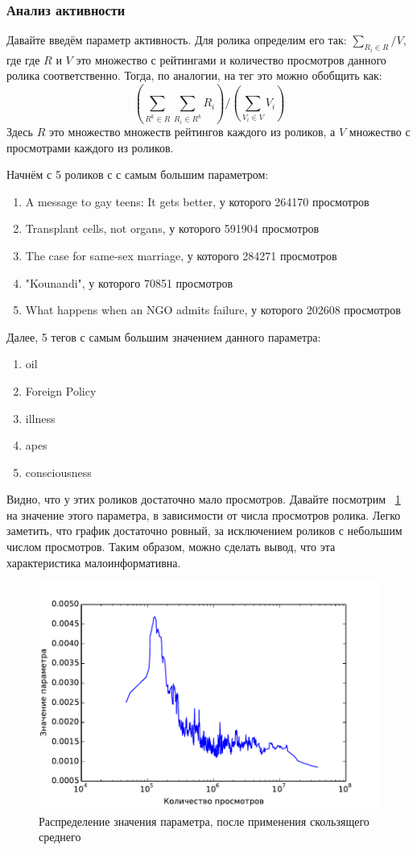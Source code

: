 \documentclass[12pt,a4paper]{scrartcl}
\begin{document}
\subsubsection{Анализ активности}
Давайте введём параметр активность. Для ролика определим его так: $\sum_{R_i \in R} / V$, где где $R$ и $V$ это множество с рейтингами и количество просмотров данного ролика соответственно. Тогда, по аналогии, на тег это можно обобщить как:
$$ \left( \sum_{R^k \in R} \sum_{R_i \in R^k} R_i \right) / \left( \sum_{V_i \in V} V_i \right) $$
Здесь $R$ это множество множеств рейтингов каждого из роликов, а $V$ множество с просмотрами каждого из роликов.

Начнём с 5 роликов с с самым большим параметром: 
\begin{enumerate}
\item A message to gay teens: It gets better, у которого 264170 просмотров
\item Transplant cells, not organs, у которого 591904 просмотров
\item The case for same-sex marriage, у которого 284271 просмотров
\item "Kounandi", у которого 70851 просмотров
\item What happens when an NGO admits failure, у которого 202608 просмотров
\end{enumerate}
Далее, 5 тегов с самым большим значением данного параметра:
\begin{enumerate}
\item oil
\item Foreign Policy
\item illness
\item apes
\item consciousness
\end{enumerate}
Видно, что у этих роликов достаточно мало просмотров. Давайте посмотрим ~\ref{running_mean} на значение этого параметра, в зависимости от числа просмотров ролика. Легко заметить, что график достаточно ровный, за исключением роликов с небольшим числом просмотров. Таким образом, можно сделать вывод, что эта характеристика малоинформативна.
\begin{figure}[hbp]
\includegraphics{running_mean.pdf}
\caption{Распределение значения параметра, после применения скользящего среднего}
\label{running_mean}
\end{figure}
\end{document}

